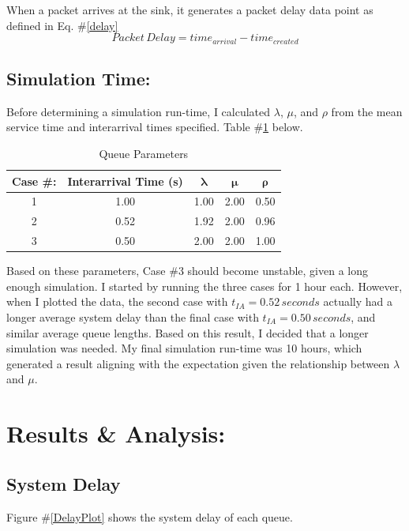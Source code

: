 \documentclass{article}
\begin{document}
When a packet arrives at the sink, it generates a packet delay data point as defined in Eq. \#\ref{delay}
\begin{equation}
	\label{delay}
	Packet \, Delay = time_{arrival} - time_{created}
\end{equation}

\newpage
\subsection*{Simulation Time:}  
Before determining a simulation run-time, I calculated $\lambda$, $\mu$, and $\rho$ from the mean service time and interarrival times specified.
Table \#\ref{Parameters} below.
\begin{table}[h!]
\centering
\begin{tabular}{|c|c|c|c|c|} \hline
\textbf{Case \#:} & Interarrival Time (s) & $\mathbf{\lambda}$ & $\mathbf{\mu}$ & $\mathbf{\rho}$ \\ \hline
1 & 1.00 & 1.00 & 2.00 & 0.50 \\ \hline
2 & 0.52 & 1.92 & 2.00 & 0.96 \\ \hline
3 & 0.50 & 2.00 & 2.00 & 1.00 \\ \hline 
\end{tabular}
\caption{Queue Parameters}
\label{Parameters}
\end{table}

Based on these parameters, Case \#3 should become unstable, given a long enough simulation.
I started by running the three cases for 1 hour each.  
However, when I plotted the data, the second case with $t_{IA}=0.52 \, seconds$ actually had a longer average system delay than the final case with $t_{IA}=0.50 \, seconds$, and similar average queue lengths.  
Based on this result, I decided that a longer simulation was needed.  
My final simulation run-time was 10 hours, which generated a result aligning with the expectation given the relationship between $\lambda$ and $\mu$.

\section*{Results \& Analysis:}

\subsection*{System Delay}
Figure \#\ref{DelayPlot} shows the system delay of each queue.
\end{document}
